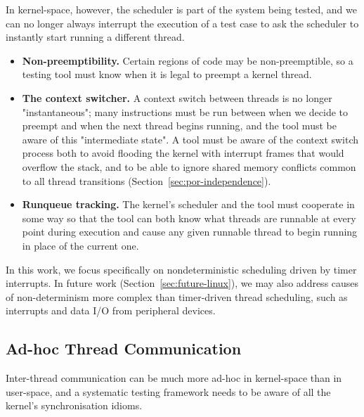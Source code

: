In kernel-space, however, the scheduler is part of the system being tested, and we can no longer always interrupt the execution of a test case to ask the scheduler to instantly start running a different thread.
\begin{itemize}
	\item {\bf Non-preemptibility.} Certain regions of code may be non-preemptible, so a testing tool must know when it is legal to preempt a kernel thread.
	\item {\bf The context switcher.} A context switch between threads is no longer "instantaneous"; many instructions must be run between when we decide to preempt and when the next thread begins running, and the tool must be aware of this "intermediate state". A tool must be aware of the context switch process both to avoid flooding the kernel with interrupt frames that would overflow the stack, and to be able to ignore shared memory conflicts common to all thread transitions (Section~\ref{sec:por-independence}).
	\item {\bf Runqueue tracking.} The kernel's scheduler and the tool must cooperate in some way so that the tool can both know what threads are runnable at every point during execution and cause any given runnable thread to begin running in place of the current one.
\end{itemize}

In this work, we focus specifically on nondeterministic scheduling driven by timer interrupts. In future work (Section~\ref{sec:future-linux}), we may also address causes of non-determinism more complex than timer-driven thread scheduling, such as interrupts and data I/O from peripheral devices.

\subsection{Ad-hoc Thread Communication}

Inter-thread communication can be much more ad-hoc in kernel-space than in user-space\cite{datacollider}, and a systematic testing framework needs to be aware of all the kernel's synchronisation idioms.

